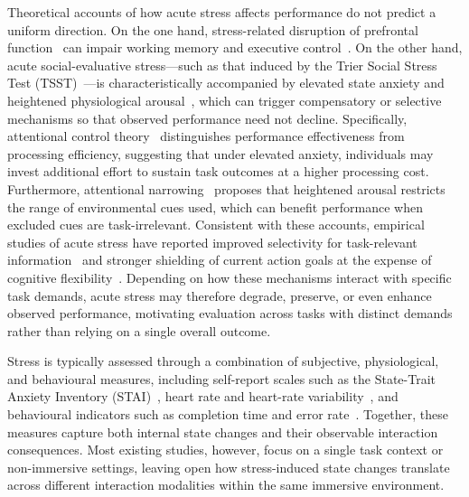 Theoretical accounts of how acute stress affects performance do not predict a uniform direction. On the one hand, stress-related disruption of prefrontal function~\citep{arnsten2009stress,qin2009acute} can impair working memory and executive control~\citep{shields2016effects}. On the other hand, acute social-evaluative stress—such as that induced by the Trier Social Stress Test (TSST)~\citep{kirschbaum1993trier}—is characteristically accompanied by elevated state anxiety and heightened physiological arousal~\citep{allen2014biological}, which can trigger compensatory or selective mechanisms so that observed performance need not decline. Specifically, attentional control theory~\citep{eysenck2007anxiety} distinguishes performance effectiveness from processing efficiency, suggesting that under elevated anxiety, individuals may invest additional effort to sustain task outcomes at a higher processing cost. Furthermore, attentional narrowing~\citep{easterbrook1959effect} proposes that heightened arousal restricts the range of environmental cues used, which can benefit performance when excluded cues are task-irrelevant. Consistent with these accounts, empirical studies of acute stress have reported improved selectivity for task-relevant information~\citep{chajut2003selective} and stronger shielding of current action goals at the expense of cognitive flexibility~\citep{plessow2011inflexibly}. Depending on how these mechanisms interact with specific task demands, acute stress may therefore degrade, preserve, or even enhance observed performance, motivating evaluation across tasks with distinct demands rather than relying on a single overall outcome.

Stress is typically assessed through a combination of subjective, physiological, and behavioural measures, including self-report scales such as the State-Trait Anxiety Inventory (STAI)~\citep{spielberger1971state}, heart rate and heart-rate variability~\citep{kim2018stress}, and behavioural indicators such as completion time and error rate~\citep{li2026survey,sarsenbayeva2019measuring}. Together, these measures capture both internal state changes and their observable interaction consequences. Most existing studies, however, focus on a single task context or non-immersive settings, leaving open how stress-induced state changes translate across different interaction modalities within the same immersive environment. 


